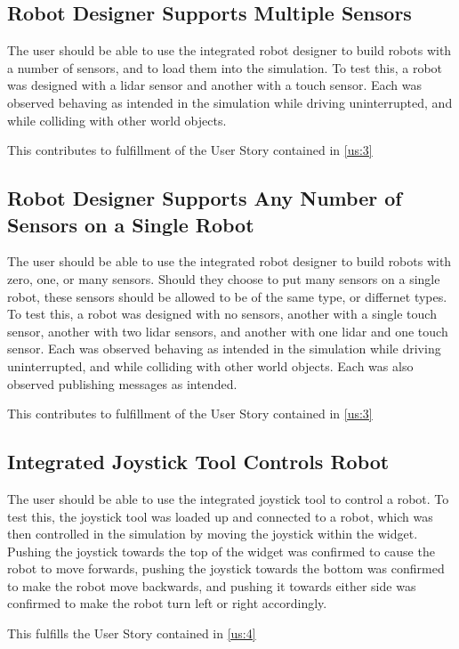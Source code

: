 \subsection{Robot Designer Supports Multiple Sensors}
The user should be able to use the integrated robot designer to build robots with a number of sensors, and to load them into the simulation. To test this, a robot was designed with a lidar sensor and another with a touch sensor. Each was observed behaving as intended in the simulation while driving uninterrupted, and while colliding with other world objects.

This contributes to fulfillment of the User Story contained in \ref{us:3}

\subsection{Robot Designer Supports Any Number of Sensors on a Single Robot}
The user should be able to use the integrated robot designer to build robots with zero, one, or many sensors. Should they choose to put many sensors on a single robot, these sensors should be allowed to be of the same type, or differnet types. To test this, a robot was designed with no sensors, another with a single touch sensor, another with two lidar sensors, and another with one lidar and one touch sensor. Each was observed behaving as intended in the simulation while driving uninterrupted, and while colliding with other world objects. Each was also observed publishing messages as intended.

This contributes to fulfillment of the User Story contained in \ref{us:3}

\subsection{Integrated Joystick Tool Controls Robot}
The user should be able to use the integrated joystick tool to control a robot. To test this, the joystick tool was loaded up and connected to a robot, which was then controlled in the simulation by moving the joystick within the widget. Pushing the joystick towards the top of the widget was confirmed to cause the robot to move forwards, pushing the joystick towards the bottom was confirmed to make the robot move backwards, and pushing it towards either side was confirmed to make the robot turn left or right accordingly.

This fulfills the User Story contained in \ref{us:4}

